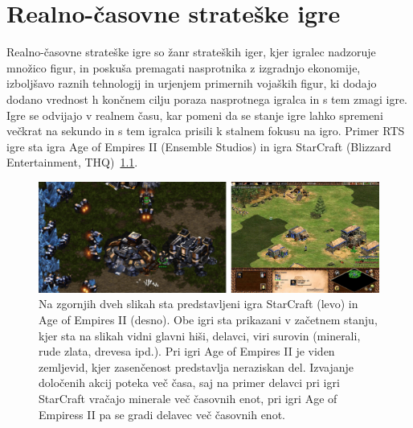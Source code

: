 \documentclass[a4paper, 12pt]{book}
\begin{document}
\chapter{Realno-časovne strateške igre}
\label{chrts}

Realno-časovne strateške igre so žanr strateških iger, kjer igralec nadzoruje množico figur, in poskuša premagati nasprotnika z izgradnjo ekonomije, izboljšavo raznih tehnologij in urjenjem primernih vojaških figur, ki dodajo dodano vrednost h končnem cilju poraza nasprotnega igralca in s tem zmagi igre.
Igre se odvijajo v realnem času, kar pomeni da se stanje igre lahko spremeni večkrat na sekundo in s tem igralca prisili k stalnem fokusu na igro.
Primer RTS igre sta igra Age of Empires II (Ensemble Studios) in igra StarCraft (Blizzard Entertainment, THQ)~\ref{picRtsGames}. 

\begin{figure}[h]
	\begin{center}
		\includegraphics[width=1.0\textwidth]{photos/horizontal_rts.pdf}
	\end{center}
	\caption{Na zgornjih dveh slikah sta predstavljeni igra StarCraft (levo) in Age of Empires II (desno). Obe igri sta prikazani v začetnem stanju, kjer sta na slikah vidni glavni hiši, delavci, viri surovin (minerali, rude zlata, drevesa ipd.). Pri igri Age of Empires II je viden zemljevid, kjer zasenčenost predstavlja neraziskan del. Izvajanje določenih akcij poteka več časa, saj na primer delavci pri igri StarCraft vračajo minerale več časovnih enot, pri igri Age of Empiress II pa se gradi delavec več časovnih enot.}
	\label{picRtsGames}
\end{figure}
\end{document}
